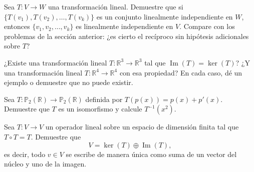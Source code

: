 \begin{prob}
Sea $T:V \to W$ una transformación lineal. Demuestre que si $\{T(v_1), T(v_2), \dots, T(v_k)\}$ es un conjunto linealmente independiente en $W$, entonces $\{v_1, v_2, \dots, v_k\}$ es linealmente independiente en $V$. Compare con los problemas de la sección anterior: ¿es cierto el recíproco sin hipótesis adicionales sobre $T$?
\end{prob}

\begin{prob}
¿Existe una transformación lineal $T:\mathbb{R}^3 \to \mathbb{R}^3$ tal que $\operatorname{Im}(T) = \ker(T)$? ¿Y una transformación lineal $T:\mathbb{R}^4 \to \mathbb{R}^4$ con esa propiedad? En cada caso, dé un ejemplo o demuestre que no puede existir.
\end{prob}

\begin{prob}
Sea $T:\mathbb{P}_2(\mathbb{R}) \to \mathbb{P}_2(\mathbb{R})$ definida por $T(p(x)) = p(x) + p'(x)$. Demuestre que $T$ es un isomorfismo y calcule $T^{-1}(x^2)$.
\end{prob}

\begin{prob}
Sea $T:V \to V$ un operador lineal sobre un espacio de dimensión finita tal que $T \circ T = T$. Demuestre que
\[
V = \ker(T) \oplus \operatorname{Im}(T),
\]
es decir, todo $v \in V$ se escribe de manera única como suma de un vector del núcleo y uno de la imagen.
\end{prob}

